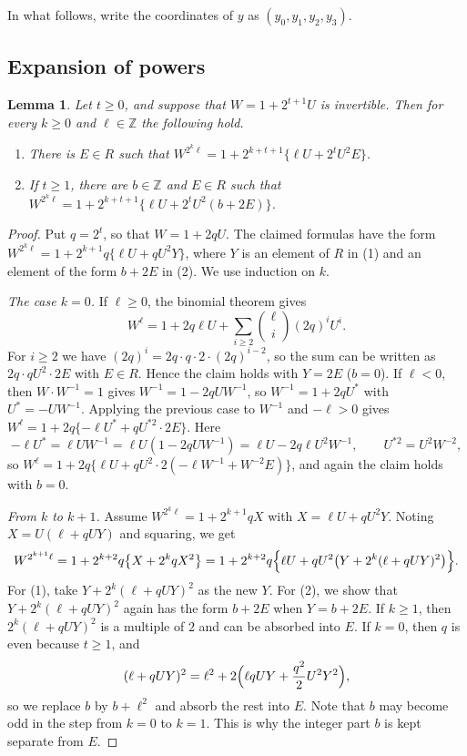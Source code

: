 \documentclass[a4paper,11pt]{article}
\theoremstyle{plain}
\newtheorem{lemma}[theorem]{Lemma}
\theoremstyle{definition}
\theoremstyle{remark}
\numberwithin{equation}{section}
\numberwithin{table}{section}
\newcommand{\Z}{\mathbb{Z}}
\begin{document}
In what follows, write the coordinates of $y$ as $(y_0,y_1,y_2,y_3)$.

\subsection{Expansion of powers}

\begin{lemma}\label{lem:power}
Let $t\ge0$, and suppose that $W=1+2^{t+1}U$ is invertible. Then for every $k\ge0$ and $\ell\in\Z$ the following hold.
\begin{enumerate}
\item There is $E\in R$ such that $W^{2^k\ell}=1+2^{k+t+1}\bigl\{\ell U+2^tU^2E\bigr\}$.
\item If $t\ge1$, there are $b\in\Z$ and $E\in R$ such that $W^{2^k\ell}=1+2^{k+t+1}\bigl\{\ell U+2^tU^2(b+2E)\bigr\}$.
\end{enumerate}
\end{lemma}

\begin{proof}
Put $q=2^t$, so that $W=1+2qU$. The claimed formulas have the form $W^{2^k\ell}=1+2^{k+1}q\{\ell U+qU^2Y\}$, where $Y$ is an element of $R$ in (1) and an element of the form $b+2E$ in (2). We use induction on $k$.

\emph{The case $k=0$.} If $\ell\ge0$, the binomial theorem gives
\[
W^\ell=1+2q\ell U+\sum_{i\ge2}\binom{\ell}{i}(2q)^iU^i.
\]
For $i\ge2$ we have $(2q)^i=2q\cdot q\cdot2\cdot(2q)^{i-2}$, so the sum can be written as $2q\cdot qU^2\cdot2E$ with $E\in R$. Hence the claim holds with $Y=2E$ ($b=0$).
If $\ell<0$, then $W\cdot W^{-1}=1$ gives $W^{-1}=1-2qUW^{-1}$, so $W^{-1}=1+2qU^*$ with $U^*=-UW^{-1}$. Applying the previous case to $W^{-1}$ and $-\ell>0$ gives $W^\ell=1+2q\{-\ell U^*+qU^{*2}\cdot2E\}$. Here
\[
-\ell U^*=\ell UW^{-1}=\ell U(1-2qUW^{-1})=\ell U-2q\ell U^2W^{-1},\qquad U^{*2}=U^2W^{-2},
\]
so $W^\ell=1+2q\bigl\{\ell U+qU^2\cdot2(-\ell W^{-1}+W^{-2}E)\bigr\}$, and again the claim holds with $b=0$.

\emph{From $k$ to $k+1$.} Assume $W^{2^k\ell}=1+2^{k+1}qX$ with $X=\ell U+qU^2Y$. Noting $X=U(\ell+qUY)$ and squaring, we get
\[
W^{2^{k+1}\ell}=1+2^{k+2}q\bigl\{X+2^kqX^2\bigr\}=1+2^{k+2}q\Bigl\{\ell U+qU^2\bigl(Y+2^k(\ell+qUY)^2\bigr)\Bigr\}.
\]
For (1), take $Y+2^k(\ell+qUY)^2$ as the new $Y$.
For (2), we show that $Y+2^k(\ell+qUY)^2$ again has the form $b+2E$ when $Y=b+2E$. If $k\ge1$, then $2^k(\ell+qUY)^2$ is a multiple of $2$ and can be absorbed into $E$. If $k=0$, then $q$ is even because $t\ge1$, and
\[
(\ell+qUY)^2=\ell^2+2\Bigl(\ell qUY+\frac{q^2}2U^2Y^2\Bigr),
\]
so we replace $b$ by $b+\ell^2$ and absorb the rest into $E$.
Note that $b$ may become odd in the step from $k=0$ to $k=1$. This is why the integer part $b$ is kept separate from $E$.
\end{proof}
\end{document}
